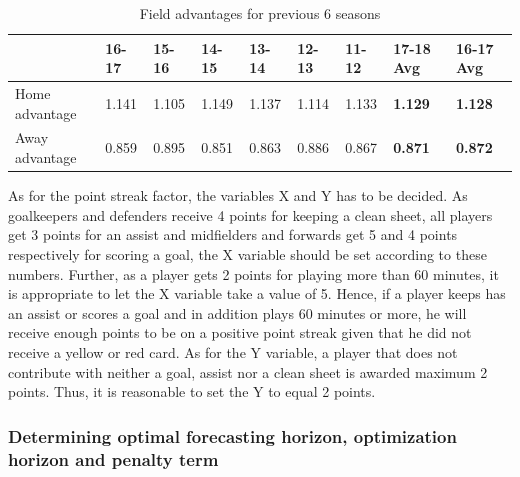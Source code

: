 \begin{table}[H]
\centering
\smaller
\caption{Field advantages for previous 6 seasons}

\begin{tabular}{|l|l|l|l|l|l|l|l|l|}
\hline
          & 16-17    & 15-16    & 14-15    & 13-14    & 12-13 & 11-12 & \textbf{17-18 Avg} & \textbf{16-17 Avg}  \\
          \hline
        
Home advantage & 1.141 & 1.105 & 1.149 & 1.137 & 1.114 & 1.133 & \textbf{1.129} & \textbf{1.128} \\
\hline
Away advantage & 0.859 & 0.895 & 0.851 & 0.863 & 0.886 & 0.867 & \textbf{0.871} & \textbf{0.872} \\
\hline
\end{tabular}
\label{Field advantage}
\end{table}




As for the point streak factor, the variables X and Y has to be decided. As goalkeepers and defenders receive 4 points for keeping a clean sheet, all players get 3 points for an assist and midfielders and forwards get 5 and 4 points respectively for scoring a goal, the X variable should be set according to these numbers. Further, as a player gets 2 points for playing more than 60 minutes, it is appropriate to let the X variable take a value of 5. Hence, if a player keeps has an assist or scores a goal and in addition plays 60 minutes or more, he will receive enough points to be on a positive point streak given that he did not receive a yellow or red card. As for the Y variable, a player that does not contribute with neither a goal, assist nor a clean sheet is awarded maximum 2 points. Thus, it is reasonable to set the Y to equal 2 points. 
\subsubsection{Determining optimal forecasting horizon, optimization horizon and penalty term}

